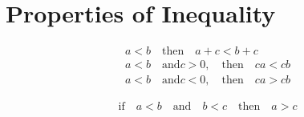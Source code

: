\documentclass[20150903-160354-rs2.2-MarksMathNotebook.tex]{subfiles}
\begin{document}
\section{Properties of Inequality}

\begin{property}
\begin{subequations}
\begin{align}
a<b \quad \text{then} \quad a + c < b + c \label{eq:spin1} \\
a<b \quad \text{and} c>0 ,\quad\text{then} \quad ca<cb \label{eq:spin2} \\
a<b \quad \text{and} c<0 ,\quad\text{then} \quad ca>cb \label{eq:spin3} 
\end{align}
\end{subequations}
\end{property}

\begin{property}
\begin{subequations}
\begin{align}
\text{if} \quad a<b \quad \text{and} \quad b<c \quad \text{then} \quad a>c \label{eq:tpin}
\end{align}
\end{subequations}
\end{property}
\end{document}
